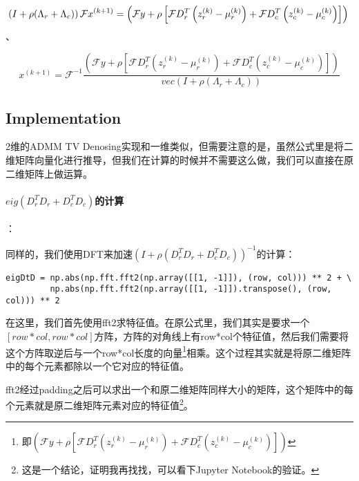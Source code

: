 \documentclass[10pt]{report}
\begin{document}
\begin{equation}
\left( I +\rho (\Lambda_r + \Lambda_c) \right) \mathcal{F} x ^{(k+1)} = \left( \mathcal{F}y + \rho \left[ \mathcal{F}D_r^T\left( z_r ^{(k)}- \mu_r ^{(k)}\right) + \mathcal{F}D_c^T\left( z_c ^{(k)}- \mu_c ^{(k)}\right) \right] \right) \\
\end{equation}、

\begin{equation}
x ^{(k+1)} =  \mathcal{F}^{-1} \frac{\left( \mathcal{F}y + \rho \left[ \mathcal{F}D_r^T\left( z_r ^{(k)}- \mu_r ^{(k)}\right) + \mathcal{F}D_c^T\left( z_c ^{(k)}- \mu_c ^{(k)}\right) \right] \right)} {vec\left( I +\rho (\Lambda_r + \Lambda_c) \right)}
\end{equation}

\subsection{Implementation}

2维的ADMM TV Denosing实现和一维类似，但需要注意的是，虽然公式里是将二维矩阵向量化进行推导，但我们在计算的时候并不需要这么做，我们可以直接在原二维矩阵上做运算。

\paragraph{$eig(D_r^TD_r + D_c^TD_c)$的计算}：

同样的，我们使用DFT来加速$\left( I +\rho (D_r^TD_r + D_c^TD_c) \right)^{-1}$的计算：

\begin{verbatim}
eigDtD = np.abs(np.fft.fft2(np.array([[1, -1]]), (row, col))) ** 2 + \
         np.abs(np.fft.fft2(np.array([[1, -1]]).transpose(), (row, col))) ** 2
\end{verbatim}

在这里，我们首先使用fft2求特征值。在原公式里，我们其实是要求一个$[row*col,row*col]$方阵，方阵的对角线上有row*col个特征值，然后我们需要将这个方阵取逆后与一个row*col长度的向量\footnote{即$\left( \mathcal{F}y + \rho \left[ \mathcal{F}D_r^T\left( z_r ^{(k)}- \mu_r ^{(k)}\right) + \mathcal{F}D_c^T\left( z_c ^{(k)}- \mu_c ^{(k)}\right) \right] \right)$}相乘。这个过程其实就是将原二维矩阵中的每个元素都除以一个它对应的特征值。

fft2经过padding之后可以求出一个和原二维矩阵同样大小的矩阵，这个矩阵中的每个元素就是原二维矩阵元素对应的特征值\footnote{这是一个结论，证明我再找找，可以看下Jupyter Notebook的验证。}。
\end{document}
